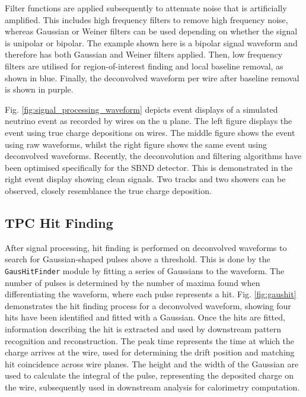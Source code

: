 Filter functions are applied subsequently to attenuate noise that is artificially amplified.
This includes high frequency filters to remove high frequency noise, whereas Gaussian or Weiner filters can be used depending on whether the signal is unipolar or bipolar.
The example shown here is a bipolar signal waveform and therefore has both Gaussian and Weiner filters applied.
Then, low frequency filters are utilised for region-of-interest finding and local baseline removal, as shown in blue.
Finally, the deconvolved waveform per wire after baseline removal is shown in purple.

Fig. \ref{fig:signal_processing_waveform} depicts event displays of a simulated neutrino event as recorded by wires on the u plane.
The left figure displays the event using true charge depositions on wires.
The middle figure shows the event using raw waveforms, whilst the right figure shows the same event using deconvolved waveforms.
Recently, the deconvolution and filtering algorithms have been optimised specifically for the SBND detector.
This is demonstrated in the right event display showing clean signals.
Two tracks and two showers can be observed, closely resemblance the true charge deposition. 

\subsection{TPC Hit Finding}

After signal processing, hit finding is performed on deconvolved waveforms to search for Gaussian-shaped pulses above a threshold.
This is done by the \texttt{GausHitFinder} module \cite{gaushitfinder} by fitting a series of Gaussians to the waveform.                                                                                  
The number of pulses is determined by the number of maxima found when differentiating the waveform, where each pulse represents a hit.                                                                   
Fig. \ref{fig:gaushit} \cite{EdPhD} demonstrates the hit finding process for a deconvolved waveform, showing four hits have been identified and fitted with a Gaussian.
Once the hits are fitted, information describing the hit is extracted and used by downstream pattern recognition and reconstruction.
The peak time represents the time at which the charge arrives at the wire, used for determining the drift position and matching hit coincidence across wire planes.
The height and the width of the Gaussian are used to calculate the integral of the pulse, representing the deposited charge on the wire, subsequently used in downstream analysis for calorimetry computation.


